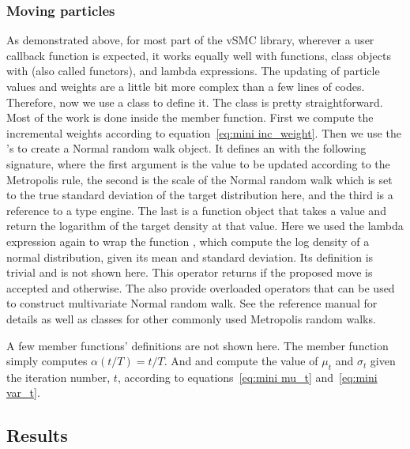 \subsubsection{Moving particles}
\label{ssub:Moving particles}

As demonstrated above, for most part of the vSMC library, wherever a user
callback function is expected, it works equally well with functions, class
objects with  (also called functors), and lambda
expressions. The updating of particle values and weights are a little bit more
complex than a few lines of codes. Therefore, now we use a class to define it.
The class is pretty straightforward. Most of the work is done inside the
 member function. First we compute the incremental
weights according to equation~\eqref{eq:mini inc_weight}. Then we use the
\vsmc's  to create a Normal random walk object. It defines
an  with the following signature,
where the first argument is the value to be updated according to the
Metropolis rule, the second is the scale of the Normal random walk which is
set to the true standard deviation of the target distribution here, and the
third is a reference to a \cppoo type \rng engine. The last is a function
object that takes a value and return the logarithm of the target density at
that value. Here we used the \cppoo lambda expression again to wrap the
function , which compute the log density of a normal
distribution, given its mean and standard deviation. Its definition is trivial
and is not shown here. This operator returns  if the proposed
move is accepted and  otherwise. The 
also provide overloaded operators that can be used to construct multivariate
Normal random walk. See the reference manual for details as well as classes
for other commonly used Metropolis random walks.

A few member functions' definitions are not shown here. The member function
 simply computes $\alpha(t/T) = t/T$. And  and
 compute the value of $\mu_t$ and $\sigma_t$ given the iteration
number, $t$, according to equations~\eqref{eq:mini mu_t} and~\eqref{eq:mini
  var_t}.

\subsection{Results}
\label{sub:Results}

